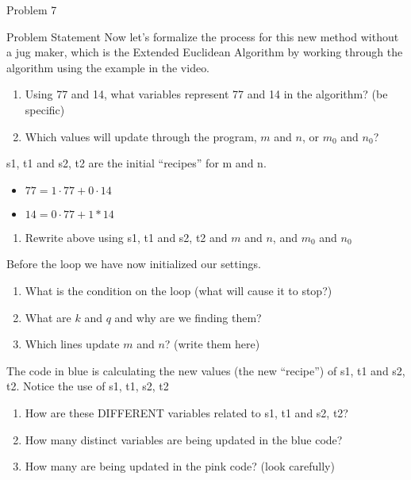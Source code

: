 \begin{problem}{Problem 7}
    \begin{statement}{Problem Statement}
        Now let's formalize the process for this new method without a jug maker, which is the Extended Euclidean Algorithm by working through the algorithm using the example in the video.

        \begin{enumerate}
            \item Using 77 and 14, what variables represent 77 and 14 in the algorithm? (be specific)
            \item Which values will update through the program, $m$ and $n$, or $m_{0}$ and $n_{0}$?
        \end{enumerate}
        s1, t1 and s2, t2 are the initial “recipes” for m and n.

        \begin{itemize}
            \item $77 = 1 \cdot 77 + 0 \cdot 14$
            \item $14 = 0 \cdot 77 + 1 * 14$
        \end{itemize}

        \begin{enumerate}[start = 3]
            \item Rewrite above using s1, t1 and s2, t2 and $m$ and $n$, and $m_{0}$ and $n_{0}$
        \end{enumerate}
        Before the loop we have now initialized our settings.

        \begin{enumerate}[start = 4]
            \item What is the condition on the loop (what will cause it to stop?)
            \item What are $k$ and $q$ and why are we finding them?
            \item Which lines update $m$ and $n$? (write them here)
        \end{enumerate}
        The code in blue is calculating the new values (the new “recipe”) of s1, t1 and s2, t2. Notice the use of s1, t1, s2, t2

        \begin{enumerate}[start = 7]
            \item How are these DIFFERENT variables related to s1, t1 and s2, t2?
            \item How many distinct variables are being updated in the blue code?
            \item How many are being updated in the pink code? (look carefully)
        \end{enumerate}
    \end{statement}


\end{problem}

